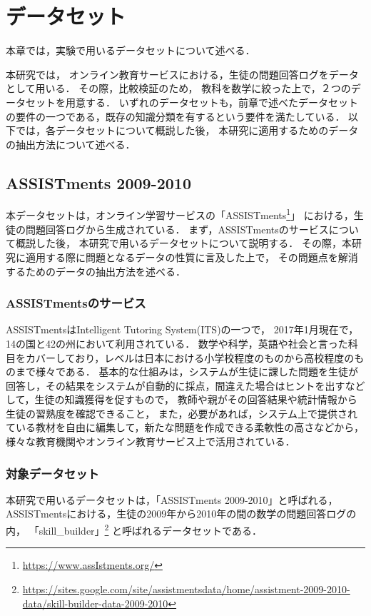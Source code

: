 \chapter{データセット}
\label{chap:dataset}
\fancyhf{}
\rhead{\thepage}
\cfoot{\thepage}


本章では，実験で用いるデータセットについて述べる．

本研究では，
オンライン教育サービスにおける，生徒の問題回答ログをデータとして用いる．
その際，比較検証のため，
教科を数学に絞った上で，２つのデータセットを用意する．
いずれのデータセットも，前章で述べたデータセットの要件の一つである，既存の知識分類を有するという要件を満たしている．
以下では，各データセットについて概説した後，
本研究に適用するためのデータの抽出方法について述べる．


\section{ASSISTments 2009-2010}
本データセットは，オンライン学習サービスの「ASSISTments\footnote{\url{https://www.assIstments.org/}}」
における，生徒の問題回答ログから生成されている．
まず，ASSISTmentsのサービスについて概説した後，
本研究で用いるデータセットについて説明する．
その際，本研究に適用する際に問題となるデータの性質に言及した上で，
その問題点を解消するためのデータの抽出方法を述べる．

\subsection{ASSISTmentsのサービス}
ASSISTmentsはIntelligent Tutoring System(ITS)の一つで，
2017年1月現在で，14の国と42の州において利用されている．
数学や科学，英語や社会と言った科目をカバーしており，レベルは日本における小学校程度のものから高校程度のものまで様々である．
基本的な仕組みは，システムが生徒に課した問題を生徒が回答し，その結果をシステムが自動的に採点，間違えた場合はヒントを出すなどして，生徒の知識獲得を促すもので，
教師や親がその回答結果や統計情報から生徒の習熟度を確認できること，
また，必要があれば，システム上で提供されている教材を自由に編集して，新たな問題を作成できる柔軟性の高さなどから，
様々な教育機関やオンライン教育サービス上で活用されている．


\subsection{対象データセット}
本研究で用いるデータセットは，「ASSISTments 2009-2010」と呼ばれる，
ASSISTmentsにおける，生徒の2009年から2010年の間の数学の問題回答ログの内，
「skill\_builder」\footnote{\url{https://sites.google.com/site/assistmentsdata/home/assistment-2009-2010-data/skill-builder-data-2009-2010}}
と呼ばれるデータセットである．

